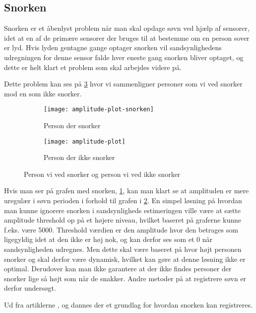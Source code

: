\subsection{Snorken}\label{section:snorken}
Snorken er et åbenlyst problem når man skal opdage søvn ved hjælp af sensorer, idet at en af de primære sensorer der bruges til at bestemme om en person sover er lyd.
Hvis lyden gentagne gange optager snorken vil sandsynlighedens udregningen for denne sensor falde hver eneste gang snorken bliver optaget, og dette er helt klart et problem som skal arbejdes videre på.

Dette problem kan ses på \cref{fig:snorke-vs-ikkesnorken} hvor vi sammenligner personer som vi ved snorker mod en som ikke snorker.

\begin{figure}
\begin{subfigure}{0.49\textwidth}
\texttt{[image: amplitude-plot-snorken]}
\caption{Person der snorker}
\label{fig:person-snorker}
\end{subfigure}
\begin{subfigure}{0.49\textwidth}
\texttt{[image: amplitude-plot]}
\caption{Person der ikke snorker}
\label{fig:person-ikke-snorker}
\end{subfigure}
\caption{Person vi ved snorker og person vi ved ikke snorker}
\label{fig:snorke-vs-ikkesnorken}
\end{figure}

Hvis man ser på grafen med snorken, \cref{fig:person-snorker}, kan man klart se at amplituden er mere uregulær i søvn perioden i forhold til grafen i \cref{fig:person-ikke-snorker}. 
En simpel løsning på hvordan man kunne ignorere snorken i sandsynligheds estimeringen ville være at sætte amplitude threshold op på et højere niveau, hvilket baseret på graferne kunne f.eks. være 5000. 
Threshold værdien er den amplitude hvor den betrages som ligegyldig idet at den ikke er høj nok, og kan derfor ses som et 0 når sandsynligheden udregnes. 
Men dette skal være baseret på hvor højt personen snorker og skal derfor være dynamisk, hvilket kan gøre at denne løsning ikke er optimal. Derudover kan man ikke garantere at der ikke findes personer der snorker lige så højt som når de snakker.
Andre metoder på at registrere søvn er derfor undersøgt.

Ud fra artiklerne \citet{Dafna2013}, \citet{Calabrese20111101} og \citet{7051338} dannes der et grundlag for hvordan snorken kan registreres.

